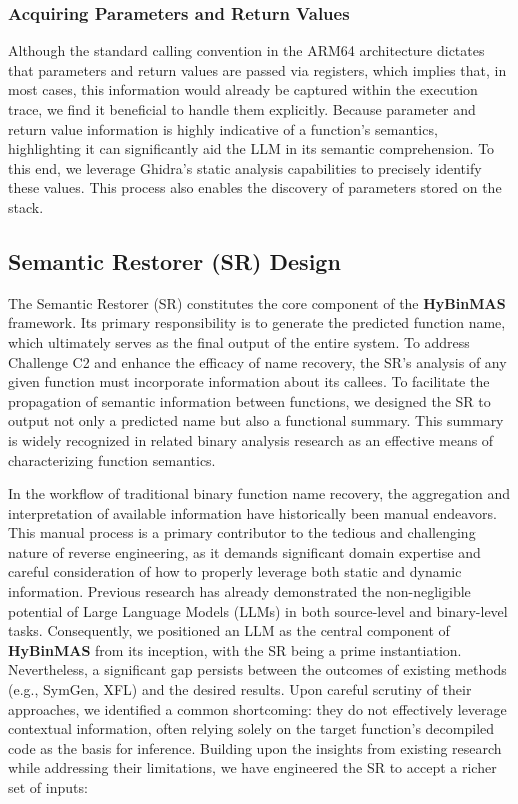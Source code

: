 \documentclass[acmsmall,screen,review,anonymous]{acmart} %
\begin{document}
\subsubsection{Acquiring Parameters and Return Values}

Although the standard calling convention in the ARM64 architecture dictates that parameters and return values are passed via registers, which implies that, in most cases, this information would already be captured within the execution trace, we find it beneficial to handle them explicitly. Because parameter and return value information is highly indicative of a function's semantics, highlighting it can significantly aid the LLM in its semantic comprehension. To this end, we leverage Ghidra's static analysis capabilities to precisely identify these values. This process also enables the discovery of parameters stored on the stack.


\subsection{Semantic Restorer (SR) Design}
\label{sec:sr_design}

The Semantic Restorer (SR) constitutes the core component of the \textbf{HyBinMAS} framework. Its primary responsibility is to generate the predicted function name, which ultimately serves as the final output of the entire system. To address Challenge C2 and enhance the efficacy of name recovery, the SR's analysis of any given function must incorporate information about its callees. To facilitate the propagation of semantic information between functions, we designed the SR to output not only a predicted name but also a functional summary. This summary is widely recognized in related binary analysis research as an effective means of characterizing function semantics.

In the workflow of traditional binary function name recovery, the aggregation and interpretation of available information have historically been manual endeavors. This manual process is a primary contributor to the tedious and challenging nature of reverse engineering, as it demands significant domain expertise and careful consideration of how to properly leverage both static and dynamic information. Previous research has already demonstrated the non-negligible potential of Large Language Models (LLMs) in both source-level and binary-level tasks. Consequently, we positioned an LLM as the central component of \textbf{HyBinMAS} from its inception, with the SR being a prime instantiation. Nevertheless, a significant gap persists between the outcomes of existing methods (e.g., SymGen, XFL) and the desired results. Upon careful scrutiny of their approaches, we identified a common shortcoming: they do not effectively leverage contextual information, often relying solely on the target function's decompiled code as the basis for inference. Building upon the insights from existing research while addressing their limitations, we have engineered the SR to accept a richer set of inputs:
\end{document}
